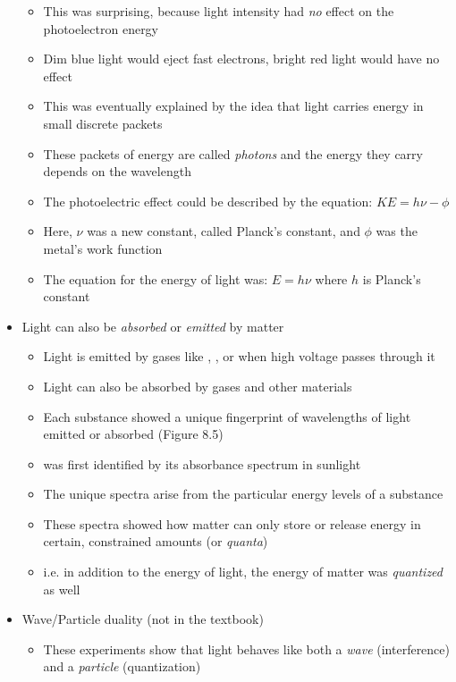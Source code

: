 \documentclass[12pt, openany, letterpaper]{memoir}
\begin{document}
\begin{itemize}
\begin{itemize}
		      \item This was surprising, because light intensity had \emph{no} effect on the photoelectron energy
		      \item Dim blue light would eject fast electrons, bright red light would have no effect
		      \item This was eventually explained by the idea that light carries energy in small discrete packets
		      \item These packets of energy are called \emph{photons} and the energy they carry depends on the wavelength
		      \item The photoelectric effect could be described by the equation: $KE = h\nu - \phi$
		      \item Here, $\nu$ was a new constant, called Planck's constant, and $\phi$ was the metal's work function
		      \item The equation for the energy of light was: $E=h\nu$ where $h$ is Planck's constant
	      \end{itemize}
	\item Light can also be \emph{absorbed} or \emph{emitted} by matter
	      \begin{itemize}
		      \item Light is emitted by gases like , , or  when high voltage passes through it
		      \item Light can also be absorbed by gases and other materials
		      \item Each substance showed a unique fingerprint of wavelengths of light emitted or absorbed (Figure 8.5)
		      \item {} was first identified by its absorbance spectrum in sunlight
		      \item The unique spectra arise from the particular energy levels of a substance
		      \item These spectra showed how matter can only store or release energy in certain, constrained amounts (or \emph{quanta})
		      \item i.e. in addition to the energy of light, the energy of matter was \emph{quantized} as well
	      \end{itemize}
	\item Wave/Particle duality (not in the textbook)
	      \begin{itemize}
		      \item These experiments show that light behaves like both a \emph{wave} (interference) and a \emph{particle} (quantization)

\end{itemize}
\end{itemize}
\end{document}
